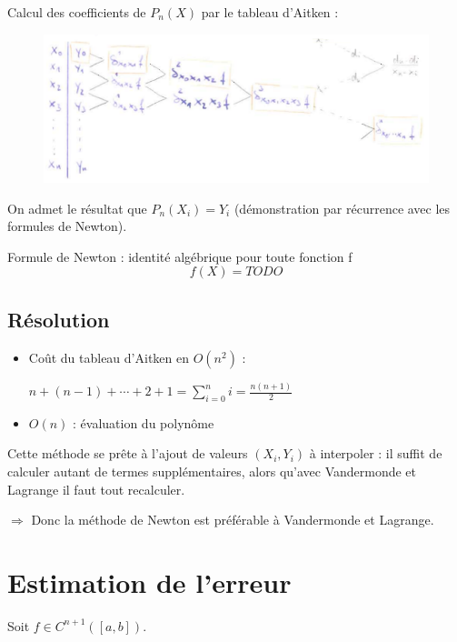 \bigbreak
Calcul des coefficients de $P_n(X)$ par le tableau d'Aitken :
\begin{figure}[h]
    \centering
    \includegraphics[scale=0.9]{2-interp-aitken.png}
\end{figure}

On admet le résultat que $P_n(X_i) = Y_i$ (démonstration par récurrence avec les formules de Newton).


Formule de Newton : identité algébrique pour toute fonction f
\begin{equation}
    f(X) = TODO
\end{equation}



\subsection* {Résolution}

\begin{itemize}
\item Coût du tableau d'Aitken en $O(n^2)$ :

$n + (n - 1) + \cdots + 2 + 1 = \sum_{i = 0}^n i = \frac{n (n + 1)}{2}$
\item $O(n)$ : évaluation du polynôme
\end{itemize}

\bigbreak
Cette méthode se prête à l'ajout de valeurs $(X_i, Y_i)$ à interpoler : il suffit de calculer autant de termes supplémentaires, alors qu'avec Vandermonde et Lagrange il faut tout recalculer.

\bigbreak
$\Rightarrow$ Donc la méthode de Newton est préférable à Vandermonde et Lagrange.



\section {Estimation de l'erreur}

Soit $f \in C^{n + 1}([a,b])$.

